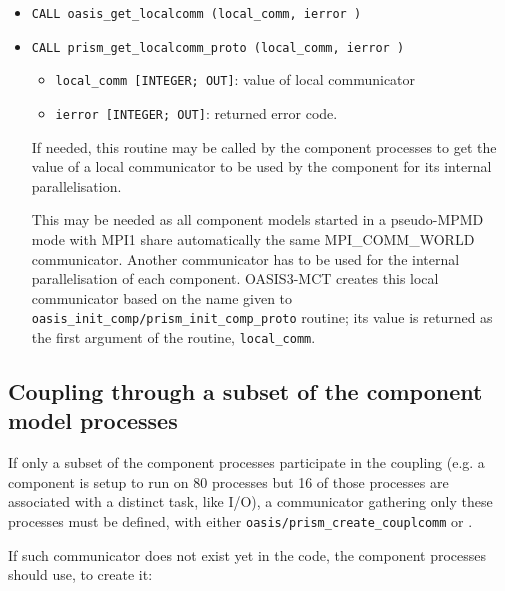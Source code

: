 \begin{itemize}
\item {\tt CALL oasis\_get\_localcomm        (local\_comm, ierror )}
\item {\tt CALL prism\_get\_localcomm\_proto (local\_comm, ierror )}

 \begin{itemize}
   \item {\tt local\_comm [INTEGER; OUT]}: value of local communicator
   \item {\tt ierror [INTEGER; OUT]}: returned error code.
 \end{itemize}

  If needed, this routine may be called by the component processes  
  to get the value of a local communicator to be used by the component
  for its internal parallelisation.

  This may be needed as all component models started in a
  pseudo-MPMD mode with MPI1 share automatically the same MPI\_COMM\_WORLD
  communicator.  Another communicator has to be used for the internal
  parallelisation of each component. OASIS3-MCT creates this local
  communicator based on the name given to {\tt oasis\_init\_comp/prism\_init\_comp\_proto} routine; its value is returned
  as the first argument of the routine, {\tt local\_comm}.

\end{itemize}

\subsection{Coupling through a subset of the component model processes}

If only a subset of the component processes participate in the coupling (e.g. a component is setup to run on 80 processes but
16 of those processes are associated with a distinct task, like I/O), a communicator gathering only these processes must be defined, with either {\tt oasis/prism\_create\_couplcomm} or .

If such communicator does not exist yet in the code, the component processes should use, to create it: 

